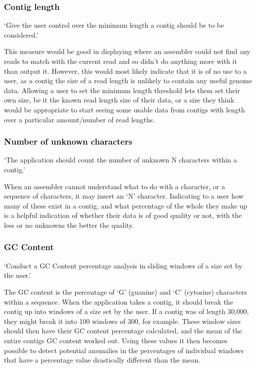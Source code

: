 \subsubsection{Contig length}
`Give the user control over the minimum length a contig should be to be considered.'

This measure would be good in displaying where an assembler could not find any reads to match with the current read and so didn't do anything more with it than output it. However, this would most likely indicate that it is of no use to a user, as a contig the size of a read length is unlikely to contain any useful genome data. Allowing a user to set the minimum length threshold lets them set their own size, be it the known read length size of their data, or a size they think would be appropriate to start seeing some usable data from contigs with length over a particular amount/number of read lengths.

\subsubsection{Number of unknown characters}
`The application should count the number of unknown N characters within a contig.'

When an assembler cannot understand what to do with a character, or a sequence of characters, it may insert an `N' character. Indicating to a user how many of these exist in a contig, and what percentage of the whole they make up is a helpful indication of whether their data is of good quality or not, with the less or no unknowns the better the quality.

\subsubsection{GC Content}
`Conduct a GC Content percentage analysis in sliding windows of a size set by the user.'

The GC content is the percentage of `G' (guanine) and `C' (cytosine) characters within a sequence\cite{citeulike:14021291}. When the application takes a contig, it should break the contig up into windows of a size set by the user. If a contig was of length 30,000, they might break it into 100 windows of 300, for example. These window sizes should then have their GC content percentage calculated, and the mean of the entire contigs GC content worked out. Using these values it then becomes possible to detect potential anomalies in the percentages of individual windows that have a percentage value drastically different than the mean.

